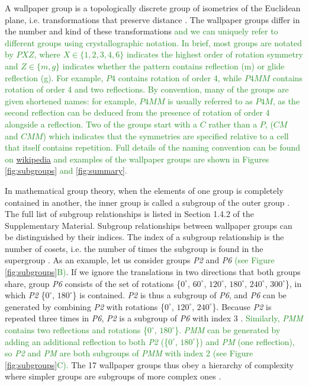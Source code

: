 \documentclass[11pt, twoside]{article}
\begin{document}
A wallpaper group is a topologically discrete group of isometries of the Euclidean plane, i.e. transformations that preserve distance \citep{RN1425}. The wallpaper groups differ in the number and kind of these transformations \textcolor{ForestGreen}{and we can uniquely refer to different groups using crystallographic notation. In brief, most groups are notated by $PXZ$, where $X\in\{1,2,3,4,6\}$ indicates the highest order of rotation symmetry and $Z\in\{m, g\}$ indicates whether the pattern contains reflection (m) or glide reflection (g). For example, $P4$ contains rotation of order 4, while $P4MM$ contains rotation of order 4 and two reflections. By convention, many of the groups are given shortened names: for example, $P4MM$ is usually referred to as $P4M$, as the second reflection can be deduced from the presence of rotation of order 4 alongside a reflection. Two of the groups start with a $C$ rather than a $P$, ($CM$ and $CMM$) which indicates that the symmetries are specified relative to a cell that itself contains repetition. Full details of the naming convention can be found on \href{https://en.wikipedia.org/wiki/Wallpaper_group}{wikipedia} and examples of the wallpaper groups are shown in Figures \ref{fig:subgroups} and \ref{fig:summary}.}

In mathematical group theory, when the elements of one group is completely contained in another, the inner group is called a subgroup of the outer group \citep{RN1425}. The full list of subgroup relationships is listed in Section 1.4.2 of the Supplementary Material. Subgroup relationships between wallpaper groups can be distinguished by their indices. The index of a subgroup relationship is the number of cosets, i.e. the number of times the subgroup is found in the supergroup \citep{RN1425}. As an example, let us consider groups \textit{P2} and \textit{P6} \textcolor{ForestGreen}{(see Figure \ref{fig:subgroups}B)}. If we ignore the translations in two directions that both groups share, group \textit{P6} consists of the set of rotations \{$0^{\circ}$, $60^{\circ}$, $120^{\circ}$, $180^{\circ}$, $240^{\circ}$, $300^{\circ}$\}, in which \textit{P2} \{$0^{\circ}$, $180^{\circ}$\} is contained. \textit{P2} is thus a subgroup of \textit{P6}, and \textit{P6} can be generated by combining \textit{P2} with rotations \{$0^{\circ}$, $120^{\circ}$, $240^{\circ}$\}. Because \textit{P2} is repeated three times in \textit{P6}, \textit{P2} is a subgroup of \textit{P6} with index 3 \citep{RN1425}. \textcolor{ForestGreen}{Similarly, \textit{PMM} contains two reflections and rotations \{$0^{\circ}$, $180^{\circ}$\}. \textit{PMM} can be generated by adding an additional reflection to both \textit{P2} (\{$0^{\circ}$, $180^{\circ}$\}) and \textit{PM} (one reflection), so \textit{P2} and \textit{PM} are both subgroups of \textit{PMM} with index 2 (see Figure \ref{fig:subgroups}C).} The 17 wallpaper groups thus obey a hierarchy of complexity where simpler groups are subgroups of more complex ones \citep{RN1711}. 
\end{document}
